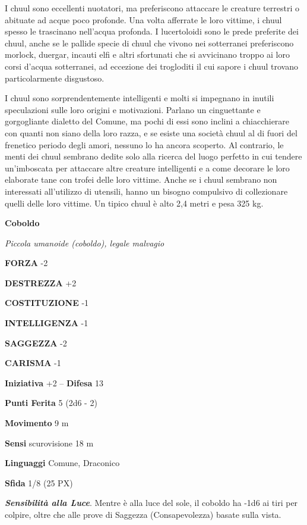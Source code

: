 \begin{multicols}{2}
	I chuul sono eccellenti nuotatori, ma preferiscono attaccare le creature terrestri o abituate ad acque poco profonde. Una volta afferrate le loro vittime, i chuul spesso le trascinano nell'acqua profonda. I lucertoloidi sono le prede preferite dei chuul, anche se le pallide specie di chuul che vivono nei sotterranei preferiscono morlock, duergar, incauti elfi e altri sfortunati che si avvicinano troppo ai loro corsi d'acqua sotterranei, ad eccezione dei trogloditi il cui sapore i chuul trovano particolarmente disgustoso.

	I chuul sono sorprendentemente intelligenti e molti si impegnano in inutili speculazioni sulle loro origini e motivazioni. Parlano un cinguettante e gorgogliante dialetto del Comune, ma pochi di essi sono inclini a chiacchierare con quanti non siano della loro razza, e se esiste una società chuul al di fuori del frenetico periodo degli amori, nessuno lo ha ancora scoperto. Al contrario, le menti dei chuul sembrano dedite solo alla ricerca del luogo perfetto in cui tendere un'imboscata per attaccare altre creature intelligenti e a come decorare le loro elaborate tane con trofei delle loro vittime. Anche se i chuul sembrano non interessati all'utilizzo di utensili, hanno un bisogno compulsivo di collezionare quelli delle loro vittime. Un tipico chuul è alto 2,4 metri e pesa 325 kg.

	\medskip{}\textbf{Coboldo}

	\textit{Piccola umanoide (coboldo), legale malvagio}

	\textbf{FORZA} -2

	\textbf{DESTREZZA} +2

	\textbf{COSTITUZIONE} -1

	\textbf{INTELLIGENZA} -1

	\textbf{SAGGEZZA} -2

	\textbf{CARISMA} -1

	\textbf{Iniziativa} +2 -- \textbf{Difesa} 13

	\textbf{Punti Ferita} 5 (2d6 - 2)

	\textbf{Movimento} 9 m

	\textbf{Sensi} scurovisione 18 m

	\textbf{Linguaggi} Comune, Draconico

	\textbf{Sfida} 1/8 (25 PX)

	\textit{\textbf{Sensibilità alla Luce}}. Mentre è alla luce del sole, il coboldo ha -1d6 ai tiri per colpire, oltre che alle prove di Saggezza (Consapevolezza) basate sulla vista.


\end{multicols}
